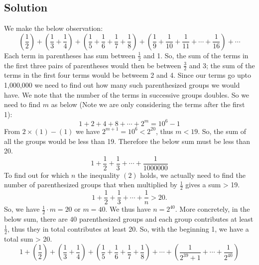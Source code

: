 \documentclass[12pt]{article}
\begin{document}
\subsection*{Solution}
We make the below observation:
\[
	\left( \frac{1}{2} \right) + \left( \frac{1}{3} + \frac{1}{4} \right) + \left( \frac{1}{5} + \frac{1}{6} + \frac{1}{7} + \frac{1}{8} \right) + \left( \frac{1}{9} + \frac{1}{10} + \frac{1}{11} + \cdots + \frac{1}{16} \right) + \cdots
\]
Each term in parentheses has sum between $\frac{1}{2}$ and 1. So, the sum of the terms in the first three pairs of parentheses would then be between $\frac{3}{2}$ and 3; the sum of the terms in the first four terms would be betweem 2 and 4. Since our terms go upto 1,000,000 we need to find out how many such parenthesized groups we would have. We note that the number of the terms in successive groups doubles. So we need to find $m$ as below (Note we are only considering the terms after the first 1):
\setcounter{equation}{0}
\begin{equation}
1 + 2 + 4 + 8 + \cdots + 2^m = 10^6-1
\end{equation}
From $2 \times (1) - (1)$ we have $2^{m+1} = 10^6 < 2^{20}$, thus $m < 19$. So, the sum of all the groups would be less than 19. Therefore the below sum must be less than 20.
\[
	1 + \frac{1}{2} + \frac{1}{3} + \cdots + \frac{1}{1000000}
\]
To find out for which $n$ the inequality $(2)$ holds, we actually need to find the number of parenthesized groups that when multiplied by $\frac{1}{2}$ gives a sum > 19.
\begin{equation}
	1 + \frac{1}{2} + \frac{1}{3} + \cdots + \frac{1}{n} > 20.
\end{equation}
So, we have $\frac{1}{2} \cdot m = 20$ or $m = 40$. We thus have $n = 2^{40}$. More concretely, in the below sum, there are $40$ parenthesized groups and each group contributes at least $\frac{1}{2}$, thus they in total contributes at least 20. So, with the beginning 1, we have a total sum > 20.
\[
	1 + \left( \frac{1}{2} \right) + \left( \frac{1}{3} + \frac{1}{4} \right) + \left( \frac{1}{5} + \frac{1}{6} + \frac{1}{7} + \frac{1}{8} \right) + \cdots + \left( \frac{1}{2^{39}+1} + \cdots + \frac{1}{2^{40}} \right)
\]
\end{document}
